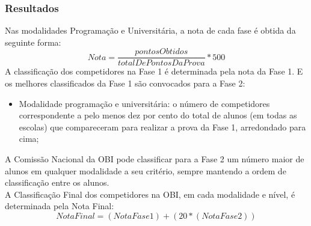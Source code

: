 \begin{frame}
 \frametitle{Resultados}
 Nas modalidades Programação e Universitária, a nota de cada fase é obtida da seguinte forma:
 \begin{equation}
  Nota = \frac{pontosObtidos}{totalDePontosDaProva} * 500
 \end{equation}
 A classificação dos competidores na Fase 1 é determinada pela nota da Fase 1.
 E os melhores classificados da Fase 1 são convocados para a Fase 2:
 \begin{itemize}
  \item Modalidade programação e universitária: o número de competidores correspondente a pelo menos
  dez por cento do total de alunos (em todas as escolas) que compareceram para realizar
  a prova da Fase 1, arredondado para cima;
 \end{itemize}
\end{frame}

\begin{frame}
 A Comissão Nacional da OBI pode classificar para a Fase 2 um número maior de alunos
 em qualquer modalidade a seu critério, sempre mantendo a ordem de classificação entre os alunos.\\
 A Classificação Final dos competidores na OBI, em cada modalidade e nível, é determinada pela Nota Final:
 \begin{equation}
  Nota Final = (Nota Fase 1) + (20 * (Nota Fase 2))
 \end{equation}

\end{frame}



